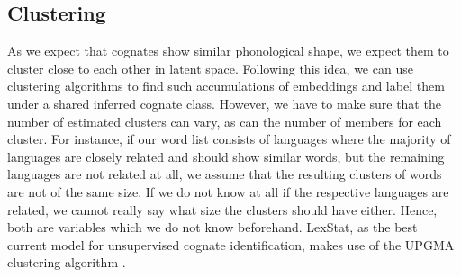 \documentclass[6pt]{article}
\begin{document}
%

\subsection{Clustering}
\label{Clustering}
As we expect that cognates show similar phonological shape, we expect them to cluster close to each other in latent space. Following this idea, we can use clustering algorithms to find such accumulations of embeddings and label them under a shared inferred cognate class. However, we have to make sure that the number of estimated clusters can vary, as can the number of members for each cluster. For instance, if our word list consists of languages where the majority of languages are closely related and should show similar words, but the remaining languages are not related at all, we assume that the resulting clusters of words are not of the same size. If we do not know at all if the respective languages are related, we cannot really say what size the clusters should have either. Hence, both are variables which we do not know beforehand. LexStat, as the best current model for unsupervised cognate identification, makes use of the UPGMA clustering algorithm \citep{sokal1958statistical}. 
\end{document}
